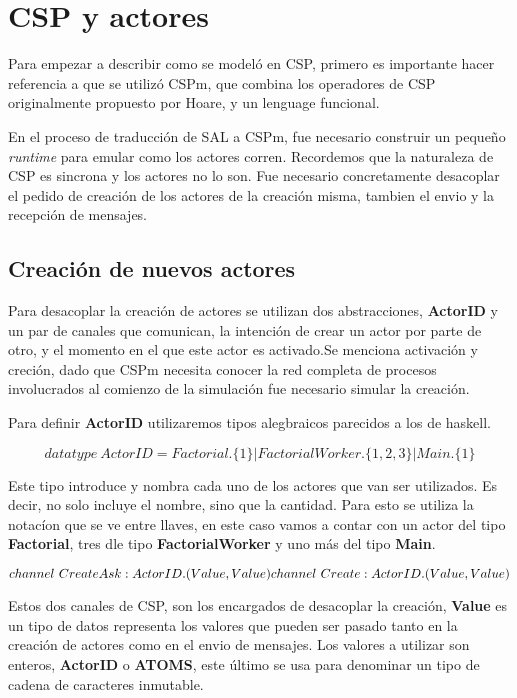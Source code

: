 \documentclass[fleqn]{article}
\begin{document}
\section{CSP y actores}
Para empezar a describir como se modeló en CSP, primero es importante hacer
referencia a que se utilizó CSPm, que combina los operadores de CSP
originalmente propuesto por Hoare, y un lenguage funcional.

En el proceso de traducción de SAL a CSPm, fue necesario construir un pequeño
\textit{runtime} para emular como los actores corren. Recordemos que la
naturaleza de CSP es sincrona y los actores no lo son. Fue necesario
concretamente desacoplar el pedido de creación de los actores de la creación
misma, tambien el envio y la recepción de mensajes. 

\subsection{Creación de nuevos actores}

Para desacoplar la creación de actores se utilizan dos abstracciones,
\textbf{ActorID} y un par de canales que comunican, la intención de crear un
actor por parte de otro, y el momento en el que este actor es activado.Se
menciona activación y creción, dado que CSPm necesita conocer la red completa
de procesos involucrados al comienzo de la simulación fue necesario simular la creación.

Para definir \textbf{ActorID} utilizaremos tipos alegbraicos parecidos a los de haskell.

\[
datatype\ ActorID = Factorial.\{1\} | FactorialWorker.\{1,2,3\} | Main.\{1\}
\]

Este tipo introduce y nombra cada uno de los actores que van ser utilizados. Es
decir, no solo incluye el nombre, sino que la cantidad. Para esto se utiliza la
notacíon que se ve entre llaves, en este caso vamos a contar con un actor del
tipo \textbf{Factorial}, tres dle tipo \textbf{FactorialWorker} y uno más del
tipo \textbf{Main}.


\[
channel\ CreateAsk:ActorID.(Value, Value)\\
channel\ Create:ActorID.(Value, Value)
\]

Estos dos canales de CSP, son los encargados de desacoplar la creación,
\textbf{Value} es un tipo de datos representa los valores que pueden ser pasado
tanto en la creación de actores como en el envio de mensajes. Los valores a
utilizar son enteros, \textbf{ActorID} o \textbf{ATOMS}, este último se usa para
denominar un tipo de cadena de caracteres inmutable.
\end{document}

